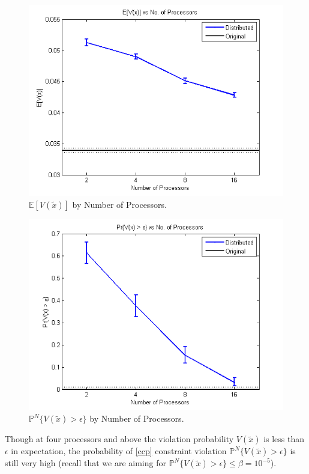 \documentclass[12pt]{article}
\begin{document}
\begin{figure}[ht]
	\centering
		\includegraphics[scale=0.9]{../plot/figs/expviolprob_numproc.png}
	\caption{$\mathbb{E}[V(\tilde{x})]$ by Number of Processors.}
	\label{fig:expviolprob_numproc}
\end{figure}

\begin{figure}[ht]
	\centering
		\includegraphics[scale=0.9]{../plot/figs/probviolprobgreateps_numproc.png}
	\caption{$\mathbb{P}^N\{V(\tilde{x}) > \epsilon \}$ by Number of Processors.}
	\label{fig:probviolprobgreateps_numproc}
\end{figure}

Though at four processors and above the violation probability $V(\tilde{x})$ is less than $\epsilon$ in expectation, the probability of \ref{ccp} constraint violation $\mathbb{P}^N\{V(\tilde{x}) > \epsilon \}$ is still very high (recall that we are aiming for $\mathbb{P}^N\{V(\tilde{x}) > \epsilon \} \leq \beta = 10^{-5}$).
\end{document}
